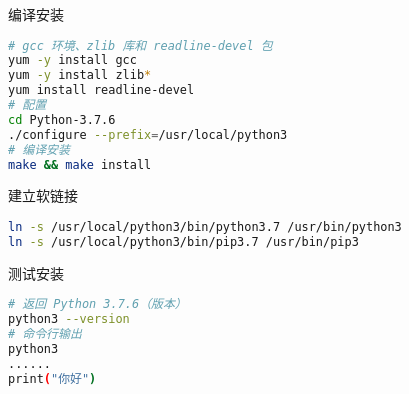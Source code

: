 编译安装
\begin{lstlisting}[language=bash]
# gcc 环境、zlib 库和 readline-devel 包
yum -y install gcc
yum -y install zlib*
yum install readline-devel
# 配置
cd Python-3.7.6
./configure --prefix=/usr/local/python3
# 编译安装
make && make install
\end{lstlisting}

建立软链接
\begin{lstlisting}[language=bash]
ln -s /usr/local/python3/bin/python3.7 /usr/bin/python3
ln -s /usr/local/python3/bin/pip3.7 /usr/bin/pip3
\end{lstlisting}

测试安装
\begin{lstlisting}[language=bash]
# 返回 Python 3.7.6（版本）
python3 --version
# 命令行输出
python3
......
print("你好")
\end{lstlisting}
